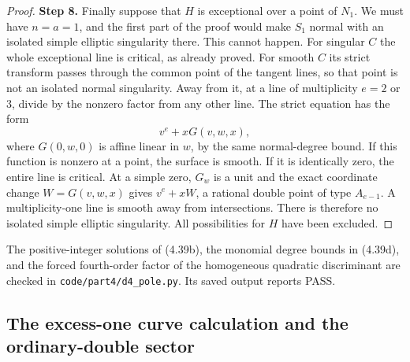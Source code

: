 \begin{proof}
\noindent\textbf{Step 8.} Finally suppose that $H$ is exceptional over a point of $N_1$.
We must have $n=a=1$, and the first part of the proof would
make $S_1$ normal with an isolated simple elliptic singularity
there. This cannot happen. For singular $C$ the whole
exceptional line is critical, as already proved. For smooth
$C$ its strict transform passes through the common point of
the tangent lines, so that point is not an isolated normal
singularity. Away from it, at a line of multiplicity
$e=2$ or $3$, divide by the nonzero factor from any other
line. The strict equation has the form
\[
                         v^e+xG(v,w,x),
\]
where $G(0,w,0)$ is affine linear in $w$, by the same
normal-degree bound. If this function is nonzero at a point,
the surface is smooth. If it is identically zero, the entire
line is critical. At a simple zero, $G_w$ is a unit and the
exact coordinate change $W=G(v,w,x)$ gives $v^e+xW$, a
rational double point of type $A_{e-1}$. A multiplicity-one
line is smooth away from intersections. There is therefore
no isolated simple elliptic singularity. All possibilities
for $H$ have been excluded.
\end{proof}

The positive-integer solutions of (4.39b), the monomial degree
bounds in (4.39d), and the forced fourth-order factor of the
homogeneous quadratic discriminant are checked in
\texttt{code/part4/d4\_pole.py}. Its saved output reports PASS.


\subsection{The excess-one curve calculation and the ordinary-double sector}

